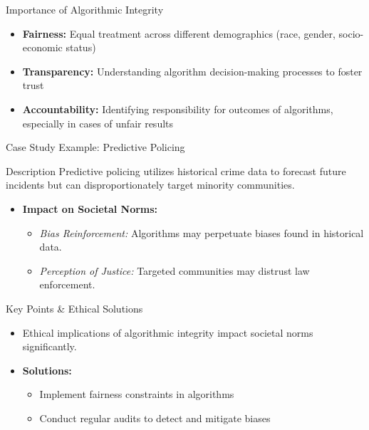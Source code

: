 \documentclass[aspectratio=169]{beamer}
\begin{document}
\begin{frame}[fragile]{Importance of Algorithmic Integrity}
    \begin{itemize}
        \item \textbf{Fairness:} Equal treatment across different demographics (race, gender, socio-economic status)
        \item \textbf{Transparency:} Understanding algorithm decision-making processes to foster trust
        \item \textbf{Accountability:} Identifying responsibility for outcomes of algorithms, especially in cases of unfair results
    \end{itemize}
\end{frame}

\begin{frame}[fragile]{Case Study Example: Predictive Policing}
    \begin{block}{Description}
        Predictive policing utilizes historical crime data to forecast future incidents but can disproportionately target minority communities.
    \end{block}
    
    \begin{itemize}
        \item \textbf{Impact on Societal Norms:}
        \begin{itemize}
            \item \textit{Bias Reinforcement:} Algorithms may perpetuate biases found in historical data.
            \item \textit{Perception of Justice:} Targeted communities may distrust law enforcement.
        \end{itemize}
    \end{itemize}
\end{frame}

\begin{frame}[fragile]{Key Points & Ethical Solutions}
    \begin{itemize}
        \item Ethical implications of algorithmic integrity impact societal norms significantly.
        \item \textbf{Solutions:}
        \begin{itemize}
            \item Implement fairness constraints in algorithms
            \item Conduct regular audits to detect and mitigate biases
        \end{itemize}
    \end{itemize}
\end{frame}
\end{document}
